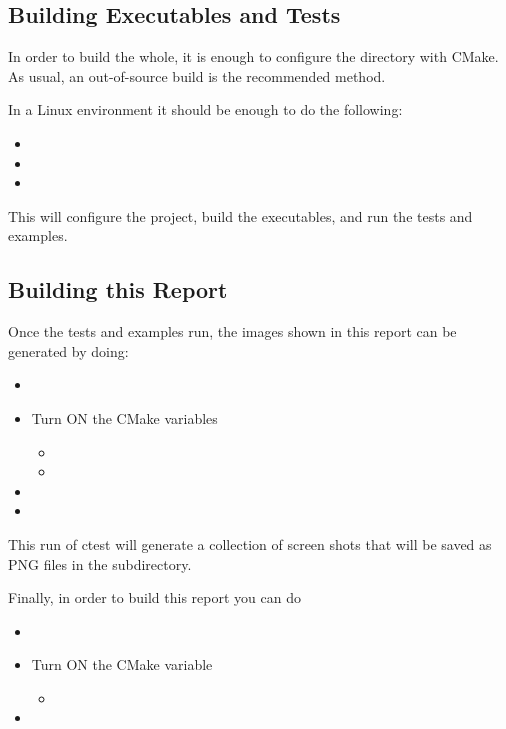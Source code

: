 \documentclass{InsightArticle}
\begin{document}
\subsection{Building Executables and Tests}

In order to build the whole, it is enough to configure the directory with
CMake. As usual, an out-of-source build is the recommended method.

In a Linux environment it should be enough to do the following:

\begin{itemize}
\item {}
\item {}
\item {}
\end{itemize}

This will configure the project, build the executables, and run the tests and
examples. 


\subsection{Building this Report}

Once the tests and examples run, the images shown in this report can be
generated by doing:

\begin{itemize}
\item {}
\item Turn ON the CMake variables
\begin{itemize}
\item {}
\item {}
\end{itemize}
\item {}
\item {}
\end{itemize}

This run of ctest will generate a collection of screen shots that will be saved
as PNG files in the  subdirectory. 

Finally, in order to build this report you can do

\begin{itemize}
\item {}
\item Turn ON the CMake variable
\begin{itemize}
\item {}
\end{itemize}
\item {}
\end{itemize}
\end{document}
